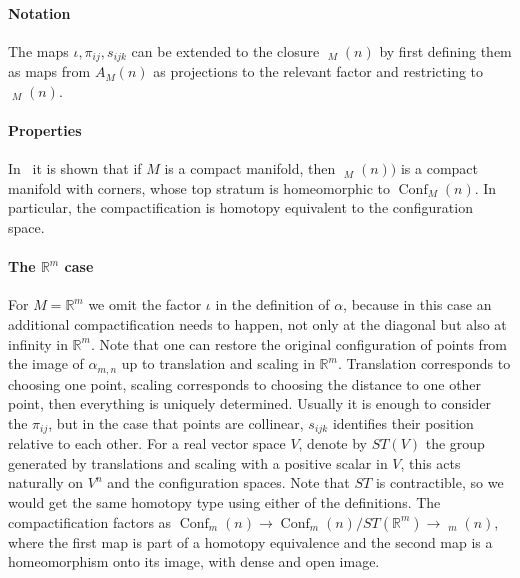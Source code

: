 \documentclass{scrartcl}
\theoremstyle{plain}
\theoremstyle{definition}
\newcommand{\R}{\mathbb R}
\DeclareMathOperator{\Conf}{Conf}
\DeclareMathOperator{\cConf}{\overline{Conf}}
\begin{document}
\paragraph{Notation} The maps $\iota, \pi_{ij}, s_{ijk}$ can be extended to the closure $\cConf_M(n)$ by first defining them as maps from $A_M(n)$ as projections to the relevant factor and restricting to $\cConf_M(n)$. 



\paragraph{Properties} In~\cite{sinha2004manifold} it is shown that if $M$ is a compact manifold, then $\cConf_M(n))$ is a compact manifold with corners, whose top stratum is homeomorphic to $\Conf_M(n)$. In particular, the compactification is homotopy equivalent to the configuration space. 


\paragraph{The $\R^m$ case} For $M = \R^m$ we omit the factor $\iota$ in the definition of $\alpha$, because in this case an additional compactification needs to happen, not only at the diagonal but also at infinity in $\R^m$. Note that one can restore the original configuration of points from the image of $\alpha_{m,n}$ up to translation and scaling in $\R^m$. Translation corresponds to choosing one point, scaling corresponds to choosing the distance to one other point, then everything is uniquely determined. Usually it is enough to consider the $\pi_{ij}$, but in the case that points are collinear, $s_{ijk}$ identifies their position relative to each other. For a real vector space $V$, denote by $ST(V)$ the group generated by translations and scaling with a positive scalar in $V$, this acts naturally on $V^n$ and the configuration spaces. Note that $ST$ is contractible, so we would get the same homotopy type using either of the definitions. The compactification factors as $\Conf_m(n) \to \Conf_m(n) / ST(\R^m) \to \cConf_m(n)$, where the first map is part of a homotopy equivalence and the second map is a homeomorphism onto its image, with dense and open image. 
\end{document}
